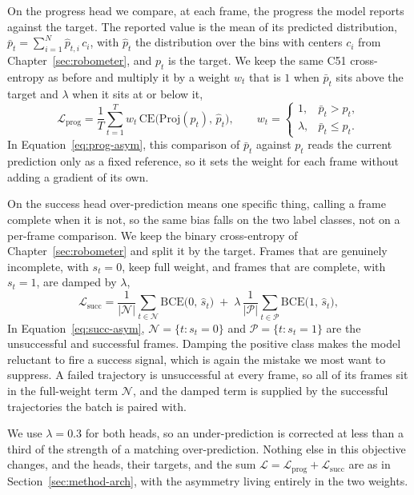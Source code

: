 On the progress head we compare, at each frame, the progress the model reports against the target. The reported value is the mean of its predicted distribution, $\bar{p}_t = \sum_{i=1}^{N} \hat{p}_{t,i}\,c_i$, with $\hat{p}_t$ the distribution over the bins with centers $c_i$ from Chapter~\ref{sec:robometer}, and $p_t$ is the target. We keep the same C51 cross-entropy as before and multiply it by a weight $w_t$ that is $1$ when $\bar{p}_t$ sits above the target and $\lambda$ when it sits at or below it,
\begin{equation}
\mathcal{L}_{\mathrm{prog}} = \frac{1}{T}\sum_{t=1}^{T} w_t\,\mathrm{CE}\!\big(\mathrm{Proj}(p_t),\, \hat{p}_t\big), \qquad
w_t = \begin{cases} 1, & \bar{p}_t > p_t,\\[2pt] \lambda, & \bar{p}_t \le p_t. \end{cases}
\label{eq:prog-asym}
\end{equation}
In Equation~\ref{eq:prog-asym}, this comparison of $\bar{p}_t$ against $p_t$ reads the current prediction only as a fixed reference, so it sets the weight for each frame without adding a gradient of its own.

On the success head over-prediction means one specific thing, calling a frame complete when it is not, so the same bias falls on the two label classes, not on a per-frame comparison. We keep the binary cross-entropy of Chapter~\ref{sec:robometer} and split it by the target. Frames that are genuinely incomplete, with $s_t = 0$, keep full weight, and frames that are complete, with $s_t = 1$, are damped by $\lambda$,
\begin{equation}
\mathcal{L}_{\mathrm{succ}} = \frac{1}{|\mathcal{N}|}\sum_{t \in \mathcal{N}} \mathrm{BCE}\!\big(0,\, \hat{s}_t\big) \;+\; \lambda\,\frac{1}{|\mathcal{P}|}\sum_{t \in \mathcal{P}} \mathrm{BCE}\!\big(1,\, \hat{s}_t\big),
\label{eq:succ-asym}
\end{equation}
In Equation~\ref{eq:succ-asym}, $\mathcal{N} = \{t : s_t = 0\}$ and $\mathcal{P} = \{t : s_t = 1\}$ are the unsuccessful and successful frames. Damping the positive class makes the model reluctant to fire a success signal, which is again the mistake we most want to suppress. A failed trajectory is unsuccessful at every frame, so all of its frames sit in the full-weight term $\mathcal{N}$, and the damped term is supplied by the successful trajectories the batch is paired with.

We use $\lambda = 0.3$ for both heads, so an under-prediction is corrected at less than a third of the strength of a matching over-prediction. Nothing else in this objective changes, and the heads, their targets, and the sum $\mathcal{L} = \mathcal{L}_{\mathrm{prog}} + \mathcal{L}_{\mathrm{succ}}$ are as in Section~\ref{sec:method-arch}, with the asymmetry living entirely in the two weights.

